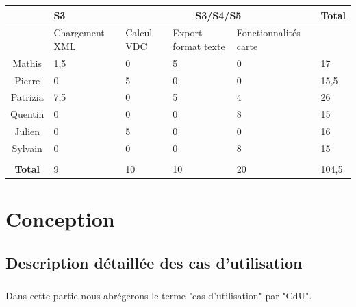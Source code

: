 \documentclass[a4paper]{report}
\begin{document}
\begin{center}
    \begin{tabular}{|c|p{2cm}|p{2cm}|p{2cm}|p{2.3cm}|p{2cm}|}
        \hline
        & S3 & \multicolumn{3}{|c|}{S3/S4/S5} & \textbf{Total} \\\hline
        & Chargement XML & Calcul VDC & Export format texte & Fonctionnalités
        carte & \\\hline
        Mathis & 1,5 & 0 & 5 & 0 & 17\\\hline
        Pierre & 0 & 5 & 0 & 0 & 15,5\\\hline
        Patrizia & 7,5 & 0 & 5 & 4 & 26\\\hline
        Quentin & 0 & 0 & 0 & 8 & 15\\\hline
        Julien & 0 & 5 & 0 & 0 & 16\\\hline
        Sylvain & 0 & 0 & 0 & 8 & 15\\\hline
        \multicolumn{6}{|c|}{}\\\hline
        \textbf{Total} & 9 & 10 & 10 & 20 & 104,5\\\hline
    \end{tabular}
\end{center}

\chapter{Conception}

\section{Description détaillée des cas d'utilisation}

\paragraph{}

Dans cette partie nous abrégerons le terme "cas d'utilisation" par "CdU". \\
\end{document}
